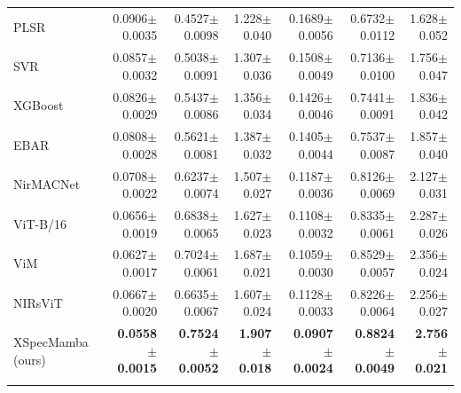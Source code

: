 \documentclass[pdflatex,sn-mathphys-num]{sn-jnl}%
\begin{document}
\begin{table}
\begin{tabular*}{\textheight}{@{\extracolsep\fill}lrrrrrr}
PLSR &
0.0906{\scriptsize$\pm$0.0035} &
0.4527{\scriptsize$\pm$0.0098} &
1.228{\scriptsize$\pm$0.040} &
0.1689{\scriptsize$\pm$0.0056} &
0.6732{\scriptsize$\pm$0.0112} &
1.628{\scriptsize$\pm$0.052} \\

SVR &
0.0857{\scriptsize$\pm$0.0032} &
0.5038{\scriptsize$\pm$0.0091} &
1.307{\scriptsize$\pm$0.036} &
0.1508{\scriptsize$\pm$0.0049} &
0.7136{\scriptsize$\pm$0.0100} &
1.756{\scriptsize$\pm$0.047} \\

XGBoost &
0.0826{\scriptsize$\pm$0.0029} &
0.5437{\scriptsize$\pm$0.0086} &
1.356{\scriptsize$\pm$0.034} &
0.1426{\scriptsize$\pm$0.0046} &
0.7441{\scriptsize$\pm$0.0091} &
1.836{\scriptsize$\pm$0.042} \\

EBAR \cite{phan2025ebar} &
0.0808{\scriptsize$\pm$0.0028} &
0.5621{\scriptsize$\pm$0.0081} &
1.387{\scriptsize$\pm$0.032} &
0.1405{\scriptsize$\pm$0.0044} &
0.7537{\scriptsize$\pm$0.0087} &
1.857{\scriptsize$\pm$0.040} \\

\midrule

NirMACNet \cite{phuong2025nirmacnet} &
0.0708{\scriptsize$\pm$0.0022} &
0.6237{\scriptsize$\pm$0.0074} &
1.507{\scriptsize$\pm$0.027} &
0.1187{\scriptsize$\pm$0.0036} &
0.8126{\scriptsize$\pm$0.0069} &
2.127{\scriptsize$\pm$0.031} \\

ViT-B/16 \cite{dosovitskiy2021image} &
0.0656{\scriptsize$\pm$0.0019} &
0.6838{\scriptsize$\pm$0.0065} &
1.627{\scriptsize$\pm$0.023} &
0.1108{\scriptsize$\pm$0.0032} &
0.8335{\scriptsize$\pm$0.0061} &
2.287{\scriptsize$\pm$0.026} \\

ViM \cite{zhu2024vision} &
0.0627{\scriptsize$\pm$0.0017} &
0.7024{\scriptsize$\pm$0.0061} &
1.687{\scriptsize$\pm$0.021} &
0.1059{\scriptsize$\pm$0.0030} &
0.8529{\scriptsize$\pm$0.0057} &
2.356{\scriptsize$\pm$0.024} \\

NIRsViT \cite{van2024nirsvit} &
0.0667{\scriptsize$\pm$0.0020} &
0.6635{\scriptsize$\pm$0.0067} &
1.607{\scriptsize$\pm$0.024} &
0.1128{\scriptsize$\pm$0.0033} &
0.8226{\scriptsize$\pm$0.0064} &
2.256{\scriptsize$\pm$0.027} \\

\midrule

XSpecMamba (ours) &
\textbf{0.0558{\scriptsize$\pm$0.0015}} &
\textbf{0.7524{\scriptsize$\pm$0.0052}} &
\textbf{1.907{\scriptsize$\pm$0.018}} &
\textbf{0.0907{\scriptsize$\pm$0.0024}} &
\textbf{0.8824{\scriptsize$\pm$0.0049}} &
\textbf{2.756{\scriptsize$\pm$0.021}} \\

\botrule
\end{tabular*}
\end{table}
\end{document}
